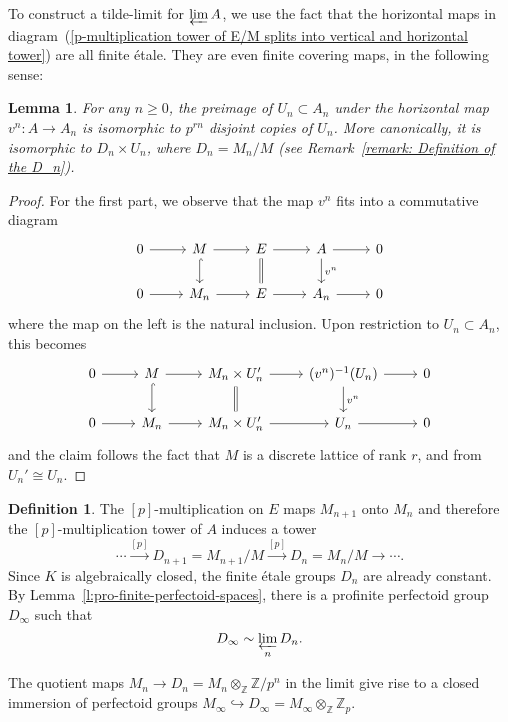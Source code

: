 \documentclass[10pt,oneside]{amsart}
\newtheorem{lemma}[theorem]{Lemma}
\theoremstyle{definition}
\newtheorem{definition}[theorem]{Definition}
\newcommand{\Z}{\mathbb{Z}}
\begin{document}
	To construct a tilde-limit for $\varprojlim A$, we use the fact that the horizontal maps in diagram~(\ref{p-multiplication tower of E/M splits into vertical and horizontal tower}) are all finite \'etale. They are even finite covering maps, in the following sense:
	\begin{lemma}\label{horizontal map is covering map}
		For any $n\geq 0$, the preimage of $U_n\subset A_n$ under the horizontal map $v^{n}\colon A\rightarrow A_n$ is isomorphic to $p^{rn}$ disjoint copies of $U_n$. More canonically, it is isomorphic to $D_{n}\times U_n$, where $D_n=M_n/M$ (see Remark~\ref{remark: Definition of the D_n}).
	\end{lemma}
	\begin{proof}
		For the first part, we observe that the map $v^n$ fits into a commutative diagram
			\begin{equation}\label{v-tower for E/M}
			\begin{tikzcd}
			0 \arrow[r] & M \arrow[d, hook] \arrow[r] & E \arrow[d,equal] \arrow[r] &  A\arrow[d, "{v^{n}}"] \arrow[r] & 0 \\
			0 \arrow[r] & M_n \arrow[r] & E \arrow[r] & A_n \arrow[r] & 0
			\end{tikzcd}
			\end{equation}
	where the map on the left is the natural inclusion. Upon restriction to $U_n\subset A_n$, this becomes
					\begin{equation}\label{v-tower for E/M-local}
		\begin{tikzcd}
		0 \arrow[r] & M \arrow[d, hook] \arrow[r] & M_n\times U'_n \arrow[d,equal] \arrow[r] &  (v^{n})^{-1}(U_n)\arrow[d, "{v^{n}}"] \arrow[r] & 0 \\
		0 \arrow[r] & M_n \arrow[r] & M_n\times U'_n \arrow[r] & U_n \arrow[r] & 0
		\end{tikzcd}
		\end{equation}
	and the claim follows the fact that $M$ is a discrete lattice of rank $r$, and from $U_n'\cong U_n$.
	\end{proof}
	\begin{definition}
The $[p]$-multiplication on $E$ maps $M_{n+1}$ onto $M_n$ and therefore the $[p]$-multiplication tower of $A$ induces a tower
 \[\cdots \xrightarrow{[p]}D_{n+1}=M_{n+1}/M\xrightarrow{[p]}D_n=M_n/M\rightarrow\cdots.\]
  Since $K$ is algebraically closed, the finite \'etale groups $D_n$ are already constant.  By Lemma~\ref{l:pro-finite-perfectoid-spaces}, there is a profinite perfectoid group $D_\infty$ such that
  \[D_\infty\sim \varprojlim_n D_n.\]
 \end{definition}
The quotient maps $M_n\to D_n=M_n\otimes_\Z \Z/p^n$ in the limit give rise to a closed immersion of perfectoid groups $M_\infty\hookrightarrow D_\infty= M_\infty\otimes_{\Z}\Z_p$.
\end{document}

